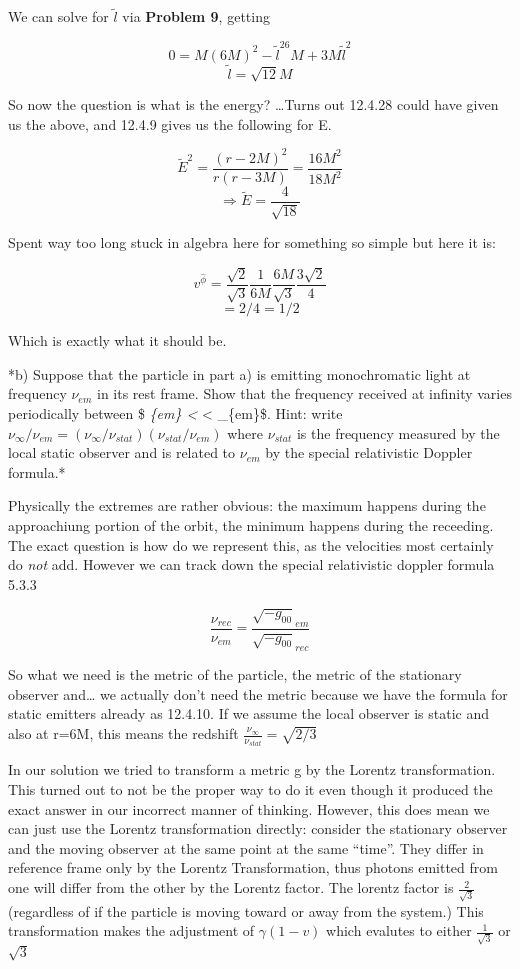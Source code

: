 \documentclass[landscape,letterpaper,10pt,english]{article}
\begin{document}
We can solve for \(\tilde l\) via \textbf{Problem 9}, getting

\[ 0 = M(6M)^2 - \tilde l^26M + 3M \tilde l^2  \]
\[ \tilde l = \sqrt{12}M \]

    So now the question is what is the energy? \ldots Turns out 12.4.28
could have given us the above, and 12.4.9 gives us the following for E.

\[ \tilde E^2 = \frac{(r-2M)^2}{r(r-3M)} = \frac{16M^2}{18M^2} \]
\[ \Rightarrow \tilde E = \frac{4}{\sqrt{18}} \]

    Spent way too long stuck in algebra here for something so simple but
here it is:

\[ v^{\hat\phi} = \frac{\sqrt{2}}{\sqrt{3}} \frac{1}{6M} \frac{6M}{\sqrt{3}} \frac{3\sqrt{2}}{4}\]
\[ = 2/4 = 1/2 \]

Which is exactly what it should be.

    *b) Suppose that the particle in part a) is emitting monochromatic light
at frequency \(\nu_{em}\) in its rest frame. Show that the frequency
received at infinity varies periodically between \$
\nu\emph{\{em\} \textless{} \nu}\infty \textless{}
 \nu\_\{em\}\$. Hint: write
\(\nu_\infty/\nu_{em} = (\nu_\infty/\nu_{stat})(\nu_{stat}/\nu_{em})\)
where \(\nu_{stat}\) is the frequency measured by the local static
observer and is related to \(\nu_{em}\) by the special relativistic
Doppler formula.*

    Physically the extremes are rather obvious: the maximum happens during
the approachiung portion of the orbit, the minimum happens during the
receeding. The exact question is how do we represent this, as the
velocities most certainly do \emph{not} add. However we can track down
the special relativistic doppler formula 5.3.3

\[ \frac{\nu_{rec}}{\nu_{em}} = \frac{\sqrt{-g_{00}}_{em}}{\sqrt{-g_{00}}_{rec}} \]

    So what we need is the metric of the particle, the metric of the
stationary observer and\ldots{} we actually don't need the metric
because we have the formula for static emitters already as 12.4.10. If
we assume the local observer is static and also at r=6M, this means the
redshift \(\frac{\nu_\infty}{\nu_{stat}} = \sqrt{2/3}\)

In our solution we tried to transform a metric g by the Lorentz
transformation. This turned out to not be the proper way to do it even
though it produced the exact answer in our incorrect manner of thinking.
However, this does mean we can just use the Lorentz transformation
directly: consider the stationary observer and the moving observer at
the same point at the same ``time''. They differ in reference frame only
by the Lorentz Transformation, thus photons emitted from one will differ
from the other by the Lorentz factor. The lorentz factor is
\(\frac{2}{\sqrt{3}}\) (regardless of if the particle is moving toward
or away from the system.) This transformation makes the adjustment of
\(\gamma(1-v)\) which evalutes to either \(\frac{1}{\sqrt{3}}\) or
\(\sqrt{3}\)
\end{document}
